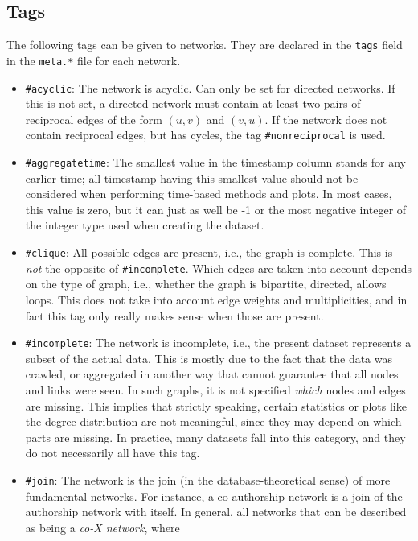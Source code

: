 \documentclass{article}
\begin{document}
\subsection{Tags}
\label{sec:tags}
The following tags can be given to networks.  They are declared in the
\texttt{tags} field in the \texttt{meta.*} file for each network. 
\begin{itemize}
\item \texttt{\#acyclic}:  The network is acyclic.  Can only be
  set for directed networks.  If this is not set, a directed
  network must contain at least two pairs of reciprocal edges of
  the form $(u,v)$ and $(v,u)$.  If the network does not contain
  reciprocal edges, but has cycles, the tag
  \texttt{\#nonreciprocal} is used.
\item \texttt{\#aggregatetime}:  The smallest value in the timestamp column
  stands for any earlier time; all timestamp having this smallest value should not be
  considered when performing time-based methods and plots.  In most
  cases, this value is zero, but it can just as well be -1 or the most
  negative integer of the integer type used when creating the dataset. 
\item \texttt{\#clique}:  All possible edges are present, i.e., the
  graph is complete.  This is \emph{not} the opposite of
  \texttt{\#incomplete}.  Which edges are taken into account depends on
  the type of graph, i.e., whether the graph is bipartite, directed,
  allows loops.  This does not take into account edge weights and
  multiplicities, and in fact this tag only really makes sense when
  those are present. 
\item \texttt{\#incomplete}: The network is incomplete, i.e.,
  the present dataset represents a subset of the actual data.  This is
  mostly due to the fact that the data was crawled, or aggregated in
  another way that cannot guarantee that all nodes and links were seen.
  In such graphs, it is not specified \emph{which} nodes and edges are
  missing.  
  This implies that strictly speaking, certain statistics or plots like 
  the degree distribution are not meaningful, since they may
  depend on which parts are missing.  In practice, many datasets
  fall into this category, and they do not necessarily all have this
  tag. 
\item \texttt{\#join}:  The network is the join (in the
  database-theoretical sense) of more
  fundamental networks.  For instance, a co-authorship network
  is a join of the authorship network with itself.  In general, all
  networks that can be described as being a \emph{co-X network}, where

\end{itemize}
\end{document}
